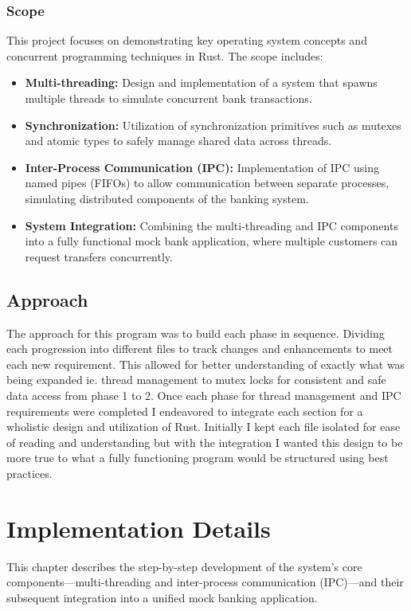 \documentclass[conference]{report}
\begin{document}
\subsection*{Scope}
This project focuses on demonstrating key operating system concepts and concurrent programming techniques in Rust. The scope includes:
\begin{itemize}
    \item \textbf{Multi-threading:} Design and implementation of a system that spawns multiple threads to simulate concurrent bank transactions.
    \item \textbf{Synchronization:} Utilization of synchronization primitives such as mutexes and atomic types to safely manage shared data across threads.
    \item \textbf{Inter-Process Communication (IPC):} Implementation of IPC using named pipes (FIFOs) to allow communication between separate processes, simulating distributed components of the banking system.
    \item \textbf{System Integration:} Combining the multi-threading and IPC components into a fully functional mock bank application, where multiple customers can request transfers concurrently.
\end{itemize}

\section*{Approach}
The approach for this program was to build each phase in sequence. Dividing each progression into different files to track changes and enhancements to meet each new requirement. This allowed for better understanding of exactly what was being expanded ie. thread management to mutex locks for consistent and safe data access from phase 1 to 2. Once each phase for thread management and IPC requirements were completed I endeavored to integrate each section for a wholistic design and utilization of Rust. Initially I kept each file isolated for ease of reading and understanding but with the integration I wanted this design to be more true to what a fully functioning program would be structured using best practices.

\chapter{Implementation Details}

This chapter describes the step-by-step development of the system's core components—multi-threading and inter-process communication (IPC)—and their subsequent integration into a unified mock banking application.
\end{document}
